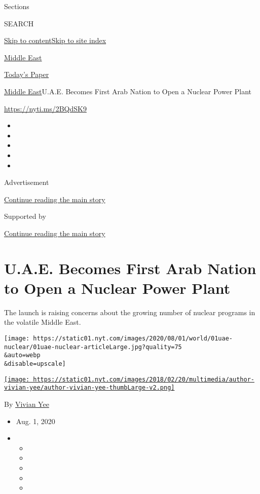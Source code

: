 Sections

SEARCH

\protect\hyperlink{site-content}{Skip to
content}\protect\hyperlink{site-index}{Skip to site index}

\href{https://www.nytimes.com/section/world/middleeast}{Middle East}

\href{https://myaccount.nytimes.com/auth/login?response_type=cookie\&client_id=vi}{}

\href{https://www.nytimes.com/section/todayspaper}{Today's Paper}

\href{/section/world/middleeast}{Middle East}\textbar{}U.A.E. Becomes
First Arab Nation to Open a Nuclear Power Plant

\url{https://nyti.ms/2BQdSK9}

\begin{itemize}
\item
\item
\item
\item
\item
\end{itemize}

Advertisement

\protect\hyperlink{after-top}{Continue reading the main story}

Supported by

\protect\hyperlink{after-sponsor}{Continue reading the main story}

\hypertarget{uae-becomes-first-arab-nation-to-open-a-nuclear-power-plant}{%
\section{U.A.E. Becomes First Arab Nation to Open a Nuclear Power
Plant}\label{uae-becomes-first-arab-nation-to-open-a-nuclear-power-plant}}

The launch is raising concerns about the growing number of nuclear
programs in the volatile Middle East.

\texttt{[image: https://static01.nyt.com/images/2020/08/01/world/01uae-nuclear/01uae-nuclear-articleLarge.jpg?quality=75\\\&auto=webp\\\&disable=upscale]}

\href{https://www.nytimes.com/by/vivian-yee}{\texttt{[image: https://static01.nyt.com/images/2018/02/20/multimedia/author-vivian-yee/author-vivian-yee-thumbLarge-v2.png]}}

By \href{https://www.nytimes.com/by/vivian-yee}{Vivian Yee}

\begin{itemize}
\item
  Aug. 1, 2020
\item
  \begin{itemize}
  \item
  \item
  \item
  \item
  \item
  \end{itemize}
\end{itemize}

